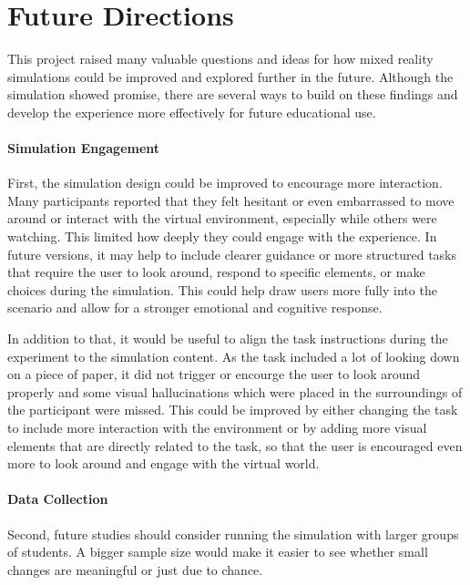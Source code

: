 \section{Future Directions}

This project raised many valuable questions and ideas for how mixed reality simulations could be improved and explored further in the future. Although the simulation showed promise, there are several ways to build on these findings and develop the experience more effectively for future educational use.

\paragraph{Simulation Engagement} First, the simulation design could be improved to encourage more interaction. Many participants reported that they felt hesitant or even embarrassed to move around or interact with the virtual environment, especially while others were watching. This limited how deeply they could engage with the experience. In future versions, it may help to include clearer guidance or more structured tasks that require the user to look around, respond to specific elements, or make choices during the simulation. This could help draw users more fully into the scenario and allow for a stronger emotional and cognitive response.

In addition to that, it would be useful to align the task instructions during the experiment to the simulation content. As the task included a lot of looking down on a piece of paper, it did not trigger or encourge the user to look around properly and some visual hallucinations which were placed in the surroundings of the participant were missed. This could be improved by either changing the task to include more interaction with the environment or by adding more visual elements that are directly related to the task, so that the user is encouraged even more to look around and engage with the virtual world.

\vspace{1em}

\paragraph{Data Collection} Second, future studies should consider running the simulation with larger groups of students. A bigger sample size would make it easier to see whether small changes are meaningful or just due to chance. 

